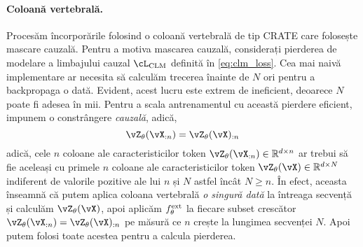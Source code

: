 \documentclass[../../book-main_ro.tex]{subfiles}
\begin{document}
\paragraph{Coloană vertebrală.} Procesăm încorporările folosind o coloană vertebrală de tip CRATE care folosește mascare cauzală. Pentru a motiva mascarea cauzală, considerați pierderea de modelare a limbajului cauzal \(\cL_{\mathrm{CLM}}\) definită în \eqref{eq:clm_loss}. Cea mai naivă implementare ar necesita să calculăm trecerea înainte de \(N\) ori pentru a backpropaga o dată. Evident, acest lucru este extrem de ineficient, deoarece \(N\) poate fi adesea în mii. Pentru a scala antrenamentul cu această pierdere eficient, impunem o constrângere \textit{cauzală}, adică,
\begin{equation}\label{eq:causal_backbone_def}
    \vZ_{\theta}(\vX_{:n}) = \vZ_{\theta}(\vX)_{:n}
\end{equation}
adică, cele \(n\) coloane ale caracteristicilor token \(\vZ_{\theta}(\vX_{:n}) \in \R^{d \times n}\) ar trebui să fie aceleași cu primele \(n\) coloane ale caracteristicilor token \(\vZ_{\theta}(\vX) \in \R^{d \times N}\) indiferent de valorile pozitive ale lui \(n\) și \(N\) astfel încât \(N \geq n\). În efect, aceasta înseamnă că putem aplica coloana vertebrală \textit{o singură dată} la întreaga secvență și calculăm \(\vZ_{\theta}(\vX)\), apoi aplicăm \(f_{\theta}^{\mathrm{ext}}\) la fiecare subset crescător \(\vZ_{\theta}(\vX_{:n}) = \vZ_{\theta}(\vX)_{:n}\) pe măsură ce \(n\) crește la lungimea secvenței \(N\). Apoi putem folosi toate acestea pentru a calcula pierderea.
\end{document}
